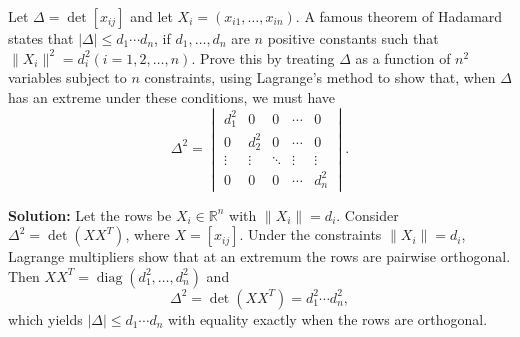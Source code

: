 \begin{problembox}
Let \(\Delta = \det [x_{ij}]\) and let \(X_i = (x_{i1}, \ldots, x_{in})\). A famous theorem of Hadamard states that \(|\Delta| \leq d_1 \cdots d_n\), if \(d_1, \ldots, d_n\) are \(n\) positive constants such that \(\| X_i \|^2 = d_i^2 (i = 1, 2, \ldots, n)\). Prove this by treating \(\Delta\) as a function of \(n^2\) variables subject to \(n\) constraints, using Lagrange's method to show that, when \(\Delta\) has an extreme under these conditions, we must have
\[\Delta^2 = 
\begin{vmatrix}
d_1^2 & 0 & 0 & \cdots & 0 \\
0 & d_2^2 & 0 & \cdots & 0 \\
\vdots & \vdots & \ddots & \vdots & \vdots \\
0 & 0 & 0 & \cdots & d_n^2
\end{vmatrix}.\]
\end{problembox}

\noindent\textbf{Solution:}
Let the rows be $X_i\in\mathbb R^n$ with $\|X_i\|=d_i$. Consider $\Delta^2=\det(XX^{\!T})$, where $X=[x_{ij}]$. Under the constraints $\|X_i\|=d_i$, Lagrange multipliers show that at an extremum the rows are pairwise orthogonal. Then $XX^{\!T}=\operatorname{diag}(d_1^2,\dots,d_n^2)$ and
\[\Delta^2=\det(XX^{\!T})=d_1^2\cdots d_n^2,\]
which yields $|\Delta|\le d_1\cdots d_n$ with equality exactly when the rows are orthogonal.